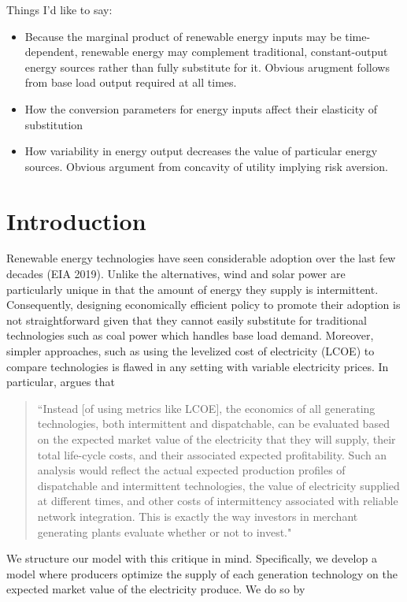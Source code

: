 \documentclass[11pt,a4paper]{extarticle}
\begin{document}
Things I'd like to say:
\begin{itemize}
	\item Because the marginal product of renewable energy inputs may be time-dependent, renewable energy may complement traditional, constant-output energy sources rather than fully substitute for it. Obvious arugment follows from base load output required at all times. 
	\item How the conversion parameters for energy inputs affect their elasticity of substitution
	\item How variability in energy output decreases the value of particular energy sources. Obvious argument from concavity of utility implying risk aversion. 
\end{itemize}

\pagebreak

\section{Introduction}

Renewable energy technologies have seen considerable adoption over the last few decades (EIA 2019). Unlike the alternatives, wind and solar power are particularly unique in that the amount of energy they supply is intermittent. Consequently, designing economically efficient policy to promote their adoption is not straightforward given that they cannot easily substitute for traditional technologies such as coal power which handles base load demand. Moreover, simpler approaches, such as using the levelized cost of electricity (LCOE) to compare technologies is flawed in any setting with variable electricity prices. In particular, \citet{Joskow2011} argues that 

\begin{quote}
	``Instead [of using metrics like LCOE], the economics of all generating technologies, both intermittent and dispatchable, can be evaluated based on the expected market value of the electricity that
	they will supply, their total life-cycle costs, and their associated expected profitability. Such an
	analysis would reflect the actual expected production profiles of dispatchable and intermittent
	technologies, the value of electricity supplied at different times, and other costs of intermittency
	associated with reliable network integration. This is exactly the way investors in merchant generating plants evaluate whether or not to invest."
\end{quote}
We structure our model with this critique in mind. Specifically, we develop a model where producers optimize the supply of each generation technology on the expected market value of the electricity produce. We do so by 
\end{document}
